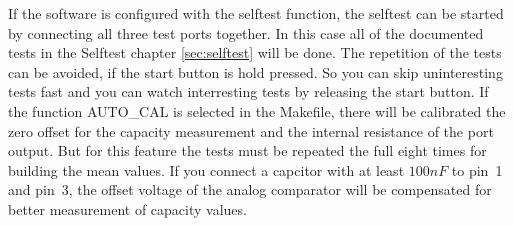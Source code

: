 If the software is configured with the selftest function, the selftest can be started by connecting all three test ports together.
In this case all of the documented tests in the Selftest chapter \ref{sec:selftest} will be done.
The repetition of the tests can be avoided, if the start button is hold pressed.
So you can skip uninteresting tests fast and you can watch interresting tests by releasing the start button.
If the function AUTO\_CAL is selected in the Makefile, there will be calibrated the zero offset for the capacity measurement
and the internal resistance of the port output. But for this feature the tests must be repeated the full eight times for
building the mean values. If you connect a capcitor with at least \(100 nF\) to pin~1 and pin~3, the offset voltage
of the analog comparator will be compensated for better measurement of capacity values.


